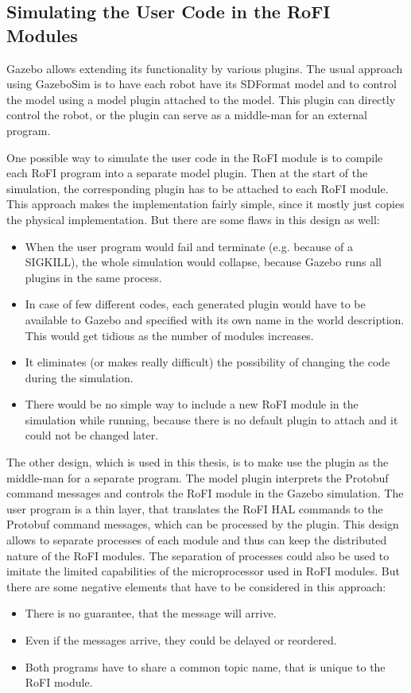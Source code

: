 \documentclass[
  digital, %
  table,   %
  oneside, %
  nolof,     %
  nolot,     %
]{fithesis3}
\begin{document}
\subsection{Simulating the User Code in the RoFI Modules}

Gazebo allows extending its functionality by various plugins.
The usual approach using GazeboSim is to have each robot have its SDFormat model and to control the model using a model plugin attached to the model.
This plugin can directly control the robot, or the plugin can serve as a middle-man for an external program.

One possible way to simulate the user code in the RoFI module is to compile each RoFI program into a separate model plugin.
Then at the start of the simulation, the corresponding plugin has to be attached to each RoFI module.
This approach makes the implementation fairly simple, since it mostly just copies the physical implementation.
But there are some flaws in this design as well:
\begin{itemize}
    \item When the user program would fail and terminate (e.g. because of a SIGKILL), the whole simulation would collapse, because Gazebo runs all plugins in the same process.
    \item In case of few different codes, each generated plugin would have to be available to Gazebo and specified with its own name in the world description.
    This would get tidious as the number of modules increases.
    \item It eliminates (or makes really difficult) the possibility of changing the code during the simulation.
    \item There would be no simple way to include a new RoFI module in the simulation while running, because there is no default plugin to attach and it could not be changed later.
\end{itemize}

The other design, which is used in this thesis, is to make use the plugin as the middle-man for a separate program.
The model plugin interprets the Protobuf command messages and controls the RoFI module in the Gazebo simulation.
The user program\label{user-program} is a thin layer, that translates the RoFI HAL commands to the Protobuf command messages, which can be processed by the plugin.
This design allows to separate processes of each module and thus can keep the distributed nature of the RoFI modules.
The separation of processes could also be used to imitate the limited capabilities of the microprocessor used in RoFI modules.
But there are some negative elements that have to be considered in this approach:
\begin{itemize}
    \item There is no guarantee, that the message will arrive.
    \item Even if the messages arrive, they could be delayed or reordered.
    \item Both programs have to share a common topic name, that is unique to the RoFI module.
\end{itemize}
\end{document}
